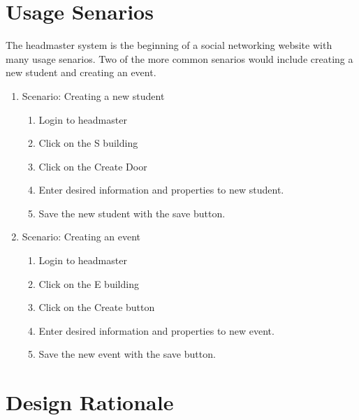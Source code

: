 \documentclass[11pt]{article}
\begin{document}
\section{Usage Senarios}
The headmaster system is the beginning of a social networking website with many usage senarios. Two of the more common senarios would include creating a new student and creating an event.
\begin{enumerate}
    \item Scenario: Creating a new student
  \begin{enumerate}
        \item Login to headmaster
        \item Click on the S building
        \item Click on the Create Door
        \item Enter desired information and properties to new student.
        \item Save the new student with the save button.
  \end{enumerate}
    \item Scenario: Creating an event
  \begin{enumerate}
        \item Login to headmaster
        \item Click on the E building
        \item Click on the Create button
        \item Enter desired information and properties to new event.
        \item Save the new event with the save button.
  \end{enumerate}
\end{enumerate}

\section{Design Rationale}
\end{document}
